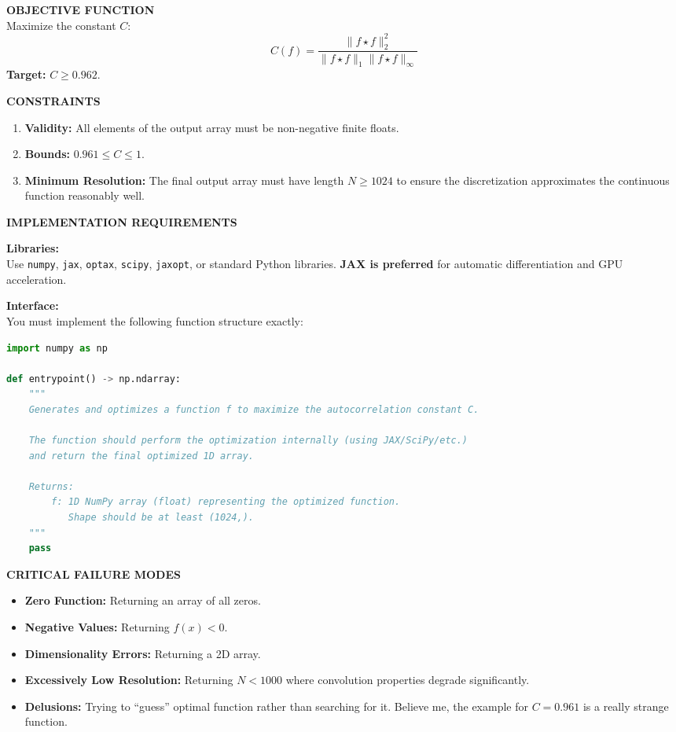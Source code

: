 \documentclass[sigconf]{acmart}
\begin{document}
\begin{paracol}{2}
\noindent \textbf{OBJECTIVE FUNCTION}\\
Maximize the constant $C$:
\[
C(f) = \frac{\|f \star f\|_2^2}{\|f \star f\|_1 \|f \star f\|_\infty}
\]
\textbf{Target:} $C \ge 0.962$.

\vspace{0.3cm}
\noindent \textbf{CONSTRAINTS}
\begin{enumerate}
    \item \textbf{Validity:} All elements of the output array must be non-negative finite floats.
    \item \textbf{Bounds:} $0.961 \le C \le 1$.
    \item \textbf{Minimum Resolution:} The final output array must have length $N \ge 1024$ to ensure the discretization approximates the continuous function reasonably well.
\end{enumerate}

\vspace{0.3cm}
\noindent \textbf{IMPLEMENTATION REQUIREMENTS}

\noindent \textbf{Libraries:}\\
Use \texttt{numpy}, \texttt{jax}, \texttt{optax}, \texttt{scipy}, \texttt{jaxopt}, or standard Python libraries. \textbf{JAX is preferred} for automatic differentiation and GPU acceleration.

\noindent \textbf{Interface:}\\
You must implement the following function structure exactly:

\begin{lstlisting}[language=Python, frame=single, basicstyle=\ttfamily\scriptsize]
import numpy as np

def entrypoint() -> np.ndarray:
    """
    Generates and optimizes a function f to maximize the autocorrelation constant C.

    The function should perform the optimization internally (using JAX/SciPy/etc.)
    and return the final optimized 1D array.

    Returns:
        f: 1D NumPy array (float) representing the optimized function. 
           Shape should be at least (1024,).
    """
    pass
\end{lstlisting}

\noindent \textbf{CRITICAL FAILURE MODES}
\begin{itemize}
    \item \textbf{Zero Function:} Returning an array of all zeros.
    \item \textbf{Negative Values:} Returning $f(x) < 0$.
    \item \textbf{Dimensionality Errors:} Returning a 2D array.
    \item \textbf{Excessively Low Resolution:} Returning $N < 1000$ where convolution properties degrade significantly.
    \item \textbf{Delusions:} Trying to ``guess'' optimal function rather than searching for it. Believe me, the example for $C = 0.961$ is a really strange function.
\end{itemize}


\end{paracol}
\end{document}
